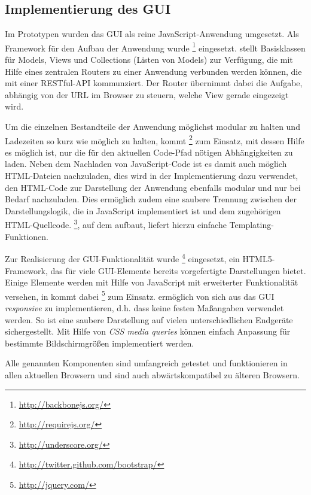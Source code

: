 \subsection{Implementierung des GUI}\label{l:implementierung-gui}

Im Prototypen wurden das GUI als reine JavaScript-Anwendung umgesetzt. Als Framework für den Aufbau der Anwendung wurde \footnote{\url{http://backbonejs.org/}} eingesetzt.  stellt Basisklassen für Models, Views und Collections (Listen von Models) zur Verfügung, die mit Hilfe eines zentralen Routers zu einer Anwendung verbunden werden können, die mit einer RESTful-API kommunziert. Der Router übernimmt dabei die Aufgabe, abhängig von der URL im Browser zu steuern, welche View gerade eingezeigt wird. 

Um die einzelnen Bestandteile der Anwendung möglichst modular zu halten und Ladezeiten so kurz wie möglich zu halten, kommt \footnote{\url{http://requirejs.org/}} zum Einsatz, mit dessen Hilfe es möglich ist, nur die für den aktuellen Code-Pfad nötigen Abhängigkeiten zu laden. Neben dem Nachladen von Ja\-va\-Scr\-ipt-Code ist es damit auch möglich HTML-Dateien nachzuladen, dies wird in der Implementierung dazu verwendet, den HTML-Code zur Darstellung der Anwendung ebenfalls modular und nur bei Bedarf nachzuladen. Dies ermöglich zudem eine saubere Trennung zwischen der Darstellungslogik, die in JavaScript implementiert ist und dem zugehörigen HTML-Quellcode. \footnote{\url{http://underscore.org/}}, auf dem  aufbaut, liefert hierzu einfache Templating-Funktionen.

Zur Realisierung der GUI-Funktionalität wurde \footnote{\url{http://twitter.github.com/bootstrap/}} eingesetzt, ein HTML5-Framework, das für viele GUI-Elemente bereits vorgefertigte Darstellungen bietet. Einige Elemente werden mit Hilfe von JavaScript mit erweiterter Funktionalität versehen, in  kommt dabei \footnote{\url{http://jquery.com/}} zum Einsatz.  ermöglich von sich aus das GUI \emph{responsive} zu implementieren, d.h. dass keine festen Maßangaben verwendet werden. So ist eine saubere Darstellung auf vielen unterschiedlichen Endgeräte sichergestellt. Mit Hilfe von \emph{CSS media queries} können einfach Anpassung für bestimmte Bildschirmgrößen implementiert werden.

Alle genannten Komponenten sind umfangreich getestet und funktionieren in allen aktuellen Browsern und sind auch abwärtskompatibel zu älteren Browsern.

